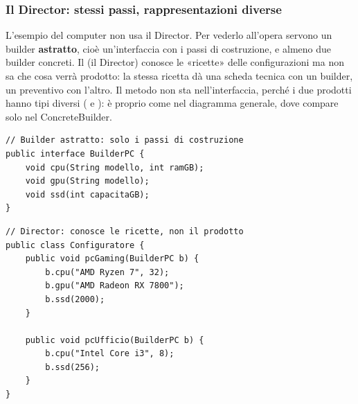\subsubsection*{Il Director: stessi passi, rappresentazioni diverse}

L'esempio del computer non usa il Director. Per vederlo all'opera servono un builder \textbf{astratto}, cioè
un'interfaccia con i passi di costruzione, e almeno due builder concreti. Il  (il Director) conosce le
«ricette» delle configurazioni ma non sa che cosa verrà prodotto: la stessa ricetta dà una scheda tecnica con un builder, un
preventivo con l'altro. Il metodo  non sta nell'interfaccia, perché i due prodotti hanno tipi diversi
( e ): è proprio come nel diagramma generale, dove  compare solo nel
ConcreteBuilder.

\begin{center}
\end{center}

\noindent\begin{minipage}[t]{0.49\textwidth}
\begin{lstlisting}[style=java, name=BuilderPC.java]
// Builder astratto: solo i passi di costruzione
public interface BuilderPC {
    void cpu(String modello, int ramGB);
    void gpu(String modello);
    void ssd(int capacitaGB);
}
\end{lstlisting}
\end{minipage}\hfill
\begin{minipage}[t]{0.49\textwidth}
\begin{lstlisting}[style=java, name=Configuratore.java]
// Director: conosce le ricette, non il prodotto
public class Configuratore {
    public void pcGaming(BuilderPC b) {
        b.cpu("AMD Ryzen 7", 32);
        b.gpu("AMD Radeon RX 7800");
        b.ssd(2000);
    }

    public void pcUfficio(BuilderPC b) {
        b.cpu("Intel Core i3", 8);
        b.ssd(256);
    }
}
\end{lstlisting}
\end{minipage}

